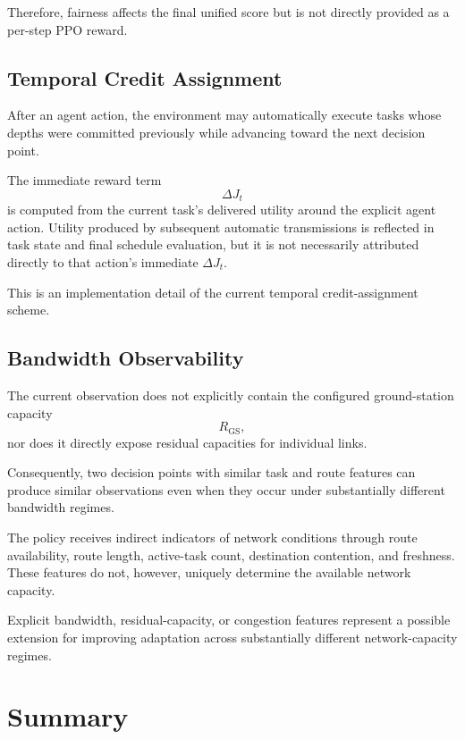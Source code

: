 \documentclass[11pt]{article}
\begin{document}
Therefore, fairness affects the final unified score but is not directly
provided as a per-step PPO reward.


\subsection{Temporal Credit Assignment}

After an agent action, the environment may automatically execute tasks whose
depths were committed previously while advancing toward the next decision
point.

The immediate reward term
\[
\Delta J_t
\]
is computed from the current task's delivered utility around the explicit
agent action. Utility produced by subsequent automatic transmissions is
reflected in task state and final schedule evaluation, but it is not
necessarily attributed directly to that action's immediate $\Delta J_t$.

This is an implementation detail of the current temporal credit-assignment
scheme.


\subsection{Bandwidth Observability}

The current observation does not explicitly contain the configured
ground-station capacity
\[
R_{\mathrm{GS}},
\]
nor does it directly expose residual capacities for individual links.

Consequently, two decision points with similar task and route features can
produce similar observations even when they occur under substantially
different bandwidth regimes.

The policy receives indirect indicators of network conditions through route
availability, route length, active-task count, destination contention, and
freshness. These features do not, however, uniquely determine the available
network capacity.

Explicit bandwidth, residual-capacity, or congestion features represent a
possible extension for improving adaptation across substantially different
network-capacity regimes.


\section{Summary}
\end{document}
